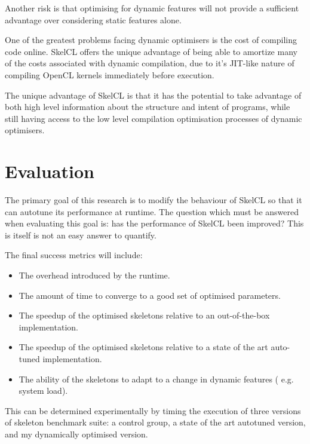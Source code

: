 Another risk is that optimising for dynamic features will not provide
a sufficient advantage over considering static features alone.

One of the greatest problems facing dynamic optimisers is the cost of
compiling code online. SkelCL offers the unique advantage of being
able to amortize many of the costs associated with dynamic
compilation, due to it's JIT-like nature of compiling OpenCL kernels
immediately before execution.

The unique advantage of SkelCL is that it has the potential to take
advantage of both high level information about the structure and
intent of programs, while still having access to the low level
compilation optimisation processes of dynamic optimisers.

\section*{Evaluation}
The primary goal of this research is to modify the behaviour of SkelCL
so that it can autotune its performance at runtime. The question which
must be answered when evaluating this goal is: has the performance of
SkelCL been improved? This is itself is not an easy answer to
quantify.


The final success metrics will include:

\begin{itemize}
\item The overhead introduced by the runtime.
\item The amount of time to converge to a good set of optimised
parameters.
\item The speedup of the optimised skeletons relative to an
out-of-the-box implementation.
\item The speedup of the optimised skeletons relative to a state of the
art auto-tuned implementation.
\item The ability of the skeletons to adapt to a change in dynamic features (
e.g. system load).
\end{itemize}

This can be determined experimentally by timing the execution of three
versions of skeleton benchmark suite: a control group, a state of the
art autotuned version, and my dynamically optimised version.

